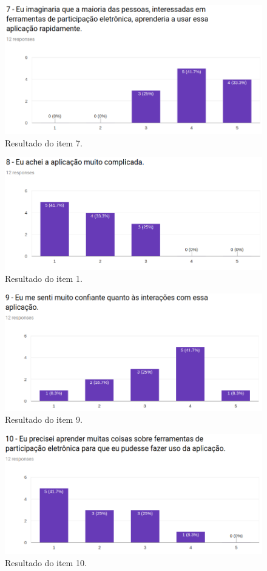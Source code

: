 \begin{figure}[!ht]
    \centering
    \includegraphics[scale=0.5]{./figuras/q7.png}
    \caption{Resultado do item 7.}
    \label{fig:q7}
\end{figure}

\begin{figure}[!ht]
    \centering
    \includegraphics[scale=0.5]{./figuras/q8.png}
    \caption{Resultado do item 1.}
    \label{fig:q8}
\end{figure}

\begin{figure}[!ht]
    \centering
    \includegraphics[scale=0.5]{./figuras/q9.png}
    \caption{Resultado do item 9.}
    \label{fig:q9}
\end{figure}

\begin{figure}[!ht]
    \centering
    \includegraphics[scale=0.5]{./figuras/q10.png}
    \caption{Resultado do item 10.}
    \label{fig:q10}
\end{figure}